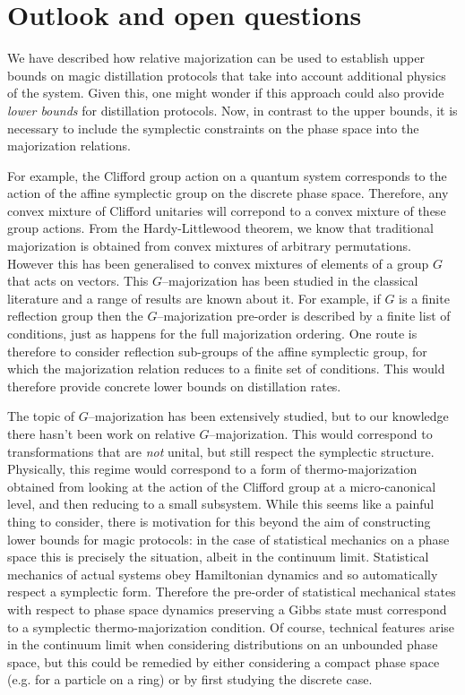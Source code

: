 \documentclass[pra,
aps,
twocolumn,
superscriptaddress,
groupedaddress,
nofootinbib,
reprint
]{revtex4-1}
\begin{document}
\section{Outlook and open questions}
\label{sec:lower_bounds}

We have described how relative majorization can be used to establish upper bounds on magic distillation protocols that take into account additional physics of the system. Given this, one might wonder if this approach could also provide \emph{lower bounds} for distillation protocols. Now, in contrast to the upper bounds, it is necessary to include the symplectic constraints on the phase space into the majorization relations.

  For example, the Clifford group action on a quantum system corresponds to the action of the affine symplectic group on the discrete phase space. Therefore, any convex mixture of Clifford unitaries will correpond to a convex mixture of these group actions. From the Hardy-Littlewood theorem, we know that traditional majorization is obtained from convex mixtures of arbitrary permutations. However this has been generalised to convex mixtures of elements of a group $G$ that acts on vectors. This $G$--majorization has been studied in the classical literature and a range of results are known about it. For example, if $G$ is a finite reflection group then the $G$--majorization pre-order is described by a finite list of conditions, just as happens for the full majorization ordering. One route is therefore to consider reflection sub-groups of the affine symplectic group, for which the majorization relation reduces to a finite set of conditions. This would therefore provide concrete lower bounds on distillation rates.
  
  The topic of $G$--majorization has been extensively studied, but to our knowledge there hasn't been work on relative $G$--majorization. This would correspond to transformations that are \emph{not} unital, but still respect the symplectic structure. Physically, this regime would correspond to a form of thermo-majorization obtained from looking at the action of the Clifford group at a micro-canonical level, and then reducing to a small subsystem. While this seems like a painful thing to consider, there is motivation for this beyond the aim of constructing lower bounds for magic protocols: in the case of statistical mechanics on a phase space this is precisely the situation, albeit in the continuum limit. Statistical mechanics of actual systems obey Hamiltonian dynamics and so automatically respect a symplectic form. Therefore the pre-order of statistical mechanical states with respect to phase space dynamics preserving a Gibbs state must correspond to a symplectic thermo-majorization condition. Of course, technical features arise in the continuum limit when considering distributions on an unbounded phase space, but this could be remedied by either considering a compact phase space (e.g. for a particle on a ring) or by first studying the discrete case.
\end{document}

